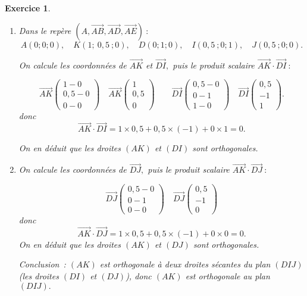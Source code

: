 \documentclass[10pt]{article}
\newtheorem{exo}{Exercice}
\begin{document}
\begin{exo}
\begin{multicols}{2}
\begin{enumerate}
\item Dans le repère $\left(A,\overrightarrow{AB},\overrightarrow{AD},\overrightarrow{AE}\right)~:$
\small
\[A(0;0;0),\quad K(1;~0,5~;0),\quad D(0;1;0),\quad I(0,5~;0;1),\quad J(0,5~;0;0).\]
\normalsize

On calcule les coordonnées de $\overrightarrow{AK}$ et $\overrightarrow{DI},$ puis le produit scalaire $\overrightarrow{AK}\cdot \overrightarrow{DI}~:$

\[\overrightarrow{AK}\begin{pmatrix} 1-0\\0,5-0\\0-0 \end{pmatrix}\quad \overrightarrow{AK}\begin{pmatrix} 1\\0,5\\0 \end{pmatrix}\qquad \overrightarrow{DI}\begin{pmatrix} 0,5-0\\0-1\\1-0 \end{pmatrix}\quad \overrightarrow{DI}\begin{pmatrix} 0,5\\-1\\1 \end{pmatrix}.\]
donc
\[\overrightarrow{AK}\cdot \overrightarrow{DI}=1\times 0,5+0,5\times (-1)+0\times 1=0.\]

On en déduit que les droites $(AK)$ et $(DI)$ sont orthogonales.
\item On calcule les coordonnées de $\overrightarrow{DJ},$ puis le produit scalaire $\overrightarrow{AK}\cdot \overrightarrow{DJ}~:$

\[\overrightarrow{DJ}\begin{pmatrix} 0,5-0\\0-1\\0-0 \end{pmatrix}\quad \overrightarrow{DJ}\begin{pmatrix} 0,5\\-1\\0 \end{pmatrix}\]
donc
\[\overrightarrow{AK}\cdot \overrightarrow{DJ}=1\times 0,5+0,5\times (-1)+0\times 0=0.\]
On en déduit que les droites $(AK)$ et $(DJ)$ sont orthogonales.

\medskip

Conclusion~: $(AK)$ est orthogonale à deux droites sécantes du plan $(DIJ)$ (les droites $(DI)$ et $(DJ)$), donc $(AK)$ est orthogonale au plan $(DIJ).$
\end{enumerate}

\end{multicols}
\end{exo}
\end{document}
